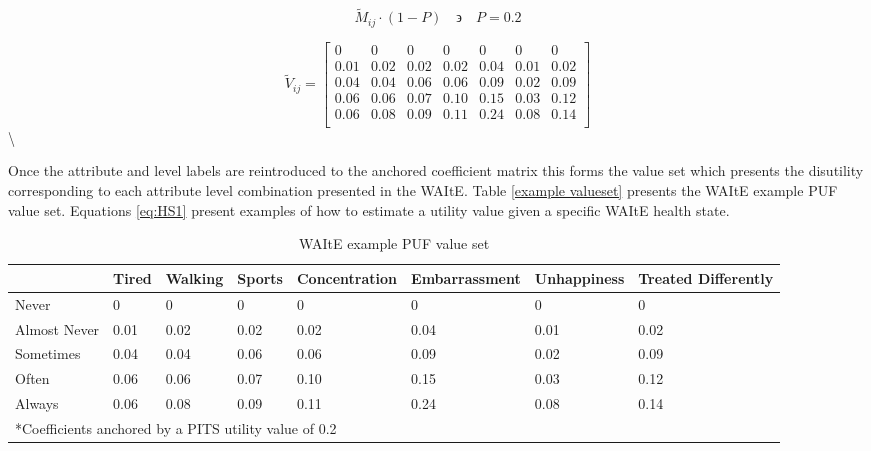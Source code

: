 \documentclass[
  letterpaper,
  DIV=11,
  numbers=noendperiod]{scrartcl}
\begin{document}
\begin{equation}\label{eq:anchoring}
    \tilde{M}_{ij} \cdot (1-P) \quad \backepsilon \quad P = 0.2 
\end{equation}

\begin{equation}\label{ma:anchored_matrix}
\tilde{V}_{ij} =  
\begin{bmatrix}
0 & 0 & 0 & 0 & 0 & 0 & 0 \\
0.01 & 0.02 & 0.02 & 0.02 & 0.04 & 0.01 & 0.02 \\
0.04 & 0.04 & 0.06 & 0.06 & 0.09 & 0.02 & 0.09 \\
0.06 & 0.06 & 0.07 & 0.10 & 0.15 & 0.03 & 0.12 \\
0.06 & 0.08 & 0.09 & 0.11 & 0.24 & 0.08 & 0.14 \\
\end{bmatrix}
\end{equation} \textbackslash{}

Once the attribute and level labels are reintroduced to the anchored
coefficient matrix this forms the value set which presents the
disutility corresponding to each attribute level combination presented
in the WAItE. Table \ref{example valueset} presents the WAItE example
PUF value set. Equations \ref{eq:HS1} present examples of how to
estimate a utility value given a specific WAItE health state.

\begin{table}[ht]
\centering
\caption{WAItE example PUF value set}

\footnotesize
\begin{tabular}{p{2cm} p{0.6cm} p{0.9cm} p{0.6cm} p{1.8cm} p{2cm} p{1.6cm} p{2.8cm}}
\toprule
& Tired & Walking & Sports & Concentration & Embarrassment & Unhappiness & Treated Differently \\
\midrule
Never          & 0 & 0 & 0 & 0 & 0 & 0 & 0 \\
Almost Never   & 0.01 & 0.02 & 0.02 & 0.02 & 0.04 & 0.01 & 0.02 \\
Sometimes      & 0.04 & 0.04 & 0.06 & 0.06 & 0.09 & 0.02 & 0.09 \\
Often          & 0.06 & 0.06 & 0.07 & 0.10 & 0.15 & 0.03 & 0.12 \\
Always         & 0.06 & 0.08 & 0.09 & 0.11 & 0.24 & 0.08 & 0.14 \\
\bottomrule
\multicolumn{8}{l}{*Coefficients anchored by a PITS utility value of 0.2}
\end{tabular}
\end{table}
\end{document}
